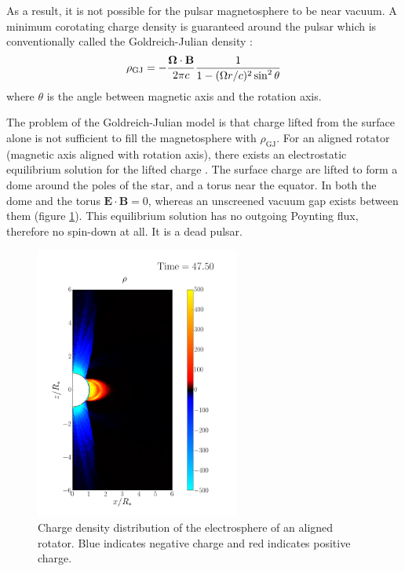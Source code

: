 As a result, it is not possible for the pulsar magnetosphere to be near vacuum.
A minimum corotating charge density is guaranteed around the pulsar which is
conventionally called the Goldreich-Julian density \citep{goldreich_pulsar_1969}:
\begin{equation}
  \label{eq:gj-density}
  \rho_\mathrm{GJ} = -\frac{\bm{\Omega}\cdot \mathbf{B}}{2\pi c}\frac{1}{1 - (\Omega r/c)^2\sin^{2}\theta}
\end{equation}
where $\theta$ is the angle between magnetic axis and the rotation axis.

The problem of the Goldreich-Julian model is that charge lifted from the
surface alone is not sufficient to fill the magnetosphere with
$\rho_\mathrm{GJ}$. For an aligned rotator (magnetic axis aligned with rotation
axis), there exists an electrostatic equilibrium solution for the lifted charge
\citep{jackson_new_1976, krause-polstorff_pulsar_1985,
  krause-polstorff_electrosphere_1985}. The surface charge are lifted to form a
dome around the poles of the star, and a torus near the equator. In both the
dome and the torus $\mathbf{E}\cdot \mathbf{B} = 0$, whereas an unscreened
vacuum gap exists between them (figure \ref{fig:electrosphere-intro}). This
equilibrium solution has no outgoing Poynting flux, therefore no spin-down at
all. It is a dead pulsar.

\begin{figure}[h]
  \centering
  \includegraphics[width=0.6\textwidth]{pics/intro/electrosphere-new.png}
  \caption{Charge density distribution of the electrosphere of an aligned
    rotator. Blue indicates negative charge and red indicates positive charge.}
  \label{fig:electrosphere-intro}
\end{figure}

